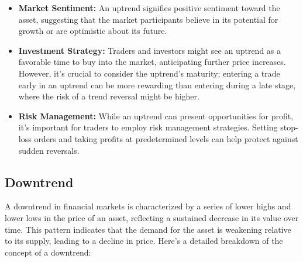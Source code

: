 \documentclass{report}
\begin{document}
    \begin{itemize}
        \item \textbf{Market Sentiment:} An uptrend signifies positive sentiment toward the asset, suggesting that the market participants believe in its potential for growth or are optimistic about its future.
        \item \textbf{Investment Strategy:} Traders and investors might see an uptrend as a favorable time to buy into the market, anticipating further price increases. However, it's crucial to consider the uptrend's maturity; entering a trade early in an uptrend can be more rewarding than entering during a late stage, where the risk of a trend reversal might be higher.
        \item \textbf{Risk Management:} While an uptrend can present opportunities for profit, it's important for traders to employ risk management strategies. Setting stop-loss orders and taking profits at predetermined levels can help protect against sudden reversals.
    \end{itemize}
    \bigbreak \noindent 

    \bigbreak \noindent 

    \bigbreak \noindent 

    \pagebreak 
    \subsection{Downtrend}
    \bigbreak \noindent 
    A downtrend in financial markets is characterized by a series of lower highs and lower lows in the price of an asset, reflecting a sustained decrease in its value over time. This pattern indicates that the demand for the asset is weakening relative to its supply, leading to a decline in price. Here’s a detailed breakdown of the concept of a downtrend:
    \bigbreak \noindent 
\end{document}
